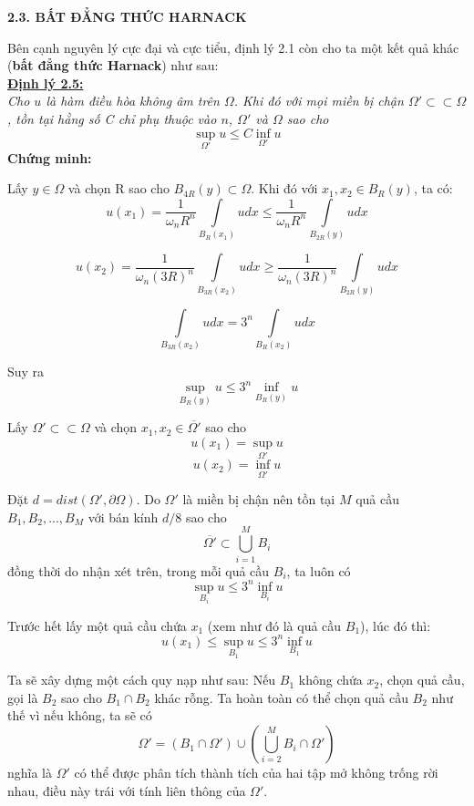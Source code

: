 \begin{center}
\textbf{2.3. BẤT ĐẲNG THỨC HARNACK}
\end{center}

Bên cạnh nguyên lý cực đại và cực tiểu, định lý 2.1 còn cho ta một kết quả khác (\textbf{bất đẳng thức Harnack}) như sau:
\\
\textbf{\underline{Định lý 2.5:}}
\\
\textit{Cho $u$ là hàm điều hòa không âm trên $\Omega$. Khi đó với mọi miền bị chận $\Omega'\subset\subset \Omega$, tồn tại hằng số C chỉ phụ thuộc vào $n$, $\Omega'$ và $\Omega$ sao cho}
\[ \mathop {\sup }\limits_{\Omega '} u \le C\mathop {\inf }\limits_{\Omega '} u \]
\textbf{{Chứng minh:}}

Lấy $y\in\Omega$ và chọn R sao cho $B_{4R}(y)\subset\Omega$. Khi đó với $x_{1}, x_{2}\in B_{R}(y)$, ta có:
\[
u(x_1 ) = \frac{1}{{\omega _n R^n }}\int\limits_{B_R (x_1 )} {u dx}  \le \frac{1}{{\omega _n R^n }}\int\limits_{B_{2R} (y)} {u dx} 
\]

\[
u(x_2 ) = \frac{1}{{\omega _n (3R)^n }}\int\limits_{B_{3R} (x_2 )} {udx}  \ge \frac{1}{{\omega _n (3R)^n }}\int\limits_{B_{2R} (y)} {udx} 
\]

\[
\int\limits_{B_{3R} (x_2 )} {udx}  = 3^n \int\limits_{B_R (x_2 )} {udx} 
\]

Suy ra \[\mathop {\sup }\limits_{B_R (y)} u \le 3^n \mathop {\inf }\limits_{B_R (y)} u\]   

Lấy $\Omega'\subset\subset\Omega$ và chọn $x_{1}, x_{2}\in\overline{\Omega'}$ sao cho
\[ u(x_1) = \mathop {\sup }\limits_{\Omega '} u\]
\[ u(x_2) = \mathop {\inf }\limits_{\Omega '} u \]

Đặt $d = dist(\Omega', \partial\Omega)$. Do $\Omega'$ là miền bị chận nên tồn tại $M$ quả cầu $B_1, B_2, ..., B_M$ với bán kính $d/8$ sao cho
\[\overline{\Omega'} \subset \bigcup\limits_{i = 1}^M {{B_i}} \]
đồng thời do nhận xét trên, trong mỗi quả cầu $B_i$, ta luôn có
\[ \mathop {\sup }\limits_{B_i} u \leq 3^n \mathop {\inf }\limits_{B_i} u\]

Trước hết lấy một quả cầu chứa $x_1$ (xem như đó là quả cầu $B_1$), lúc đó thì:
\[u(x_1) \leq \mathop {\sup }\limits_{B_1} u \leq 3^n \mathop {\inf }\limits_{B_1} u\]

Ta sẽ xây dựng một cách quy nạp như sau: Nếu $B_1$ không chứa $x_2$, chọn quả cầu, gọi là $B_2$ sao cho $B_1 \cap B_2$ khác rỗng. Ta hoàn toàn có thể chọn quả cầu $B_2$ như thế vì nếu không, ta sẽ có
\[\Omega' = (B_1 \cap \Omega') \cup ( \bigcup\limits_{i = 2}^M {{B_i}}\cap \Omega')\] 
nghĩa là $\Omega'$ có thể được phân tích thành tích của hai tập mở không trống rời nhau, điều này trái với tính liên thông của $\Omega'$.

